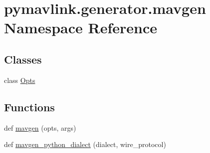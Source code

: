 \hypertarget{namespacepymavlink_1_1generator_1_1mavgen}{}\section{pymavlink.\+generator.\+mavgen Namespace Reference}
\label{namespacepymavlink_1_1generator_1_1mavgen}
\subsection*{Classes}
\begin{DoxyCompactItemize}
\item 
class \mbox{\hyperlink{classpymavlink_1_1generator_1_1mavgen_1_1Opts}{Opts}}
\end{DoxyCompactItemize}
\subsection*{Functions}
\begin{DoxyCompactItemize}
\item 
def \mbox{\hyperlink{namespacepymavlink_1_1generator_1_1mavgen_a457749ca62432f0cf01d11d6a0a6e09e}{mavgen}} (opts, args)
\item 
def \mbox{\hyperlink{namespacepymavlink_1_1generator_1_1mavgen_a9dcfcc3bcf015ac643dc9335255a40df}{mavgen\+\_\+python\+\_\+dialect}} (dialect, wire\+\_\+protocol)
\end{DoxyCompactItemize}
